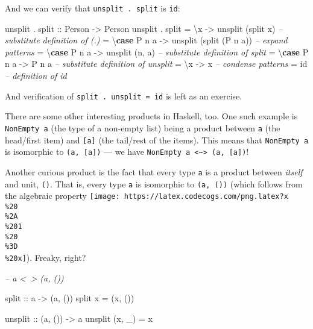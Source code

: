 \documentclass[]{article}
\newenvironment{Shaded}{}{}
\newcommand{\CommentTok}[1]{\textcolor[rgb]{0.38,0.63,0.69}{\textit{#1}}}
\newcommand{\DataTypeTok}[1]{\textcolor[rgb]{0.56,0.13,0.00}{#1}}
\newcommand{\FunctionTok}[1]{\textcolor[rgb]{0.02,0.16,0.49}{#1}}
\newcommand{\KeywordTok}[1]{\textcolor[rgb]{0.00,0.44,0.13}{\textbf{#1}}}
\newcommand{\NormalTok}[1]{#1}
\newcommand{\OtherTok}[1]{\textcolor[rgb]{0.00,0.44,0.13}{#1}}
\begin{document}
And we can verify that \texttt{unsplit\ .\ split} is \texttt{id}:

\begin{Shaded}
\begin{Highlighting}[]
\NormalTok{unsplit }\FunctionTok{.}\OtherTok{ split ::} \DataTypeTok{Person} \OtherTok{->} \DataTypeTok{Person}
\NormalTok{unsplit }\FunctionTok{.}\NormalTok{ split}
    \FunctionTok{=}\NormalTok{ \textbackslash{}x          }\OtherTok{->}\NormalTok{ unsplit (split x)        }\CommentTok{-- substitute definition of (.)}
    \FunctionTok{=}\NormalTok{ \textbackslash{}}\KeywordTok{case} \DataTypeTok{P}\NormalTok{ n a }\OtherTok{->}\NormalTok{ unsplit (split (}\DataTypeTok{P}\NormalTok{ n a))  }\CommentTok{-- expand patterns}
    \FunctionTok{=}\NormalTok{ \textbackslash{}}\KeywordTok{case} \DataTypeTok{P}\NormalTok{ n a }\OtherTok{->}\NormalTok{ unsplit (n, a)           }\CommentTok{-- substitute definition of split}
    \FunctionTok{=}\NormalTok{ \textbackslash{}}\KeywordTok{case} \DataTypeTok{P}\NormalTok{ n a }\OtherTok{->} \DataTypeTok{P}\NormalTok{ n a                    }\CommentTok{-- substitute definition of unsplit}
    \FunctionTok{=}\NormalTok{ \textbackslash{}x      }\OtherTok{->}\NormalTok{ x                            }\CommentTok{-- condense patterns}
    \FunctionTok{=}\NormalTok{ id                                      }\CommentTok{-- definition of id}
\end{Highlighting}
\end{Shaded}

And verification of \texttt{split\ .\ unsplit\ =\ id} is left as an exercise.

There are some other interesting products in Haskell, too. One such example is
\texttt{NonEmpty\ a} (the type of a non-empty list) being a product between
\texttt{a} (the head/first item) and \texttt{{[}a{]}} (the tail/rest of the
items). This means that \texttt{NonEmpty\ a} is isomorphic to
\texttt{(a,\ {[}a{]})} --- we have
\texttt{NonEmpty\ a\ \textless{}\textasciitilde{}\textgreater{}\ (a,\ {[}a{]})}!

Another curious product is the fact that every type \texttt{a} is a product
between \emph{itself} and unit, \texttt{()}. That is, every type \texttt{a} is
isomorphic to \texttt{(a,\ ())} (which follows from the algebraic property
\texttt{[image: https://latex.codecogs.com/png.latex?x\\\%20\\\%2A\\\%201\\\%20\\\%3D\\\%20x]}).
Freaky, right?

\begin{Shaded}
\begin{Highlighting}[]
\CommentTok{-- a <~> (a, ())}

\OtherTok{split ::}\NormalTok{ a }\OtherTok{->}\NormalTok{ (a, ())}
\NormalTok{split x }\FunctionTok{=}\NormalTok{ (x, ())}

\OtherTok{unsplit ::}\NormalTok{ (a, ()) }\OtherTok{->}\NormalTok{ a}
\NormalTok{unsplit (x, _) }\FunctionTok{=}\NormalTok{ x}
\end{Highlighting}
\end{Shaded}
\end{document}
